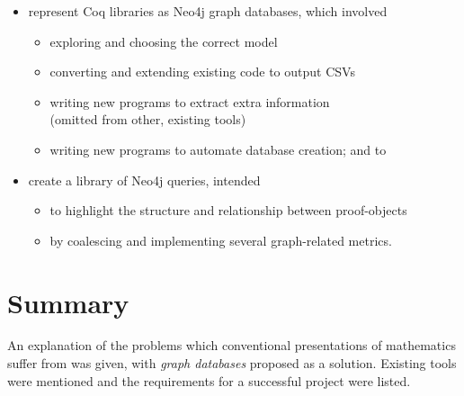 \begin{itemize}
\item represent Coq libraries as Neo4j graph databases, which involved
  \begin{itemize}
  \item exploring and choosing the correct model
  \item converting and extending existing code to output CSVs
  \item writing new programs to extract extra information \\
      (omitted from other, existing tools)
  \item writing new programs to automate database creation; and to
  \end{itemize}

\item create a library of Neo4j queries, intended
  \begin{itemize}
  \item to highlight the structure and relationship between proof-objects
  \item by coalescing and implementing several graph-related metrics.
  \end{itemize}
\end{itemize}

\section{Summary}

An explanation of the problems which conventional presentations of mathematics
suffer from was given, with \emph{graph databases} proposed as a solution. 
Existing tools were mentioned and the requirements for a successful project
were listed.
